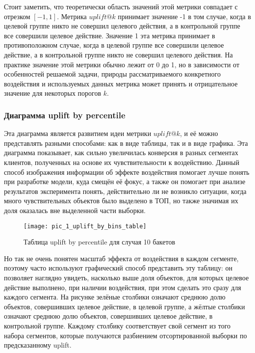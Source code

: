 Стоит заметить, что теоретически область значений этой метрики совпадает с отрезком $[-1, 1]$. Метрика $uplift@k$ принимает значение -1 в том случае, когда в целевой группе никто не совершил целевого действия, а в контрольной группе все совершили целевое действие. Значение 1 эта метрика принимает в противоположном случае, когда в целевой группе все совершили целевое действие, а в контрольной группе никто не совершил целевого действия. На практике значение этой метрики обычно лежит от 0 до 1, но в зависимости от особенностей решаемой задачи, природы рассматриваемого конкретного воздействия и используемых данных метрика может принять и отрицательное значение для некоторых порогов $k$.




\subsubsection*{Диаграмма uplift by percentile}

Эта диаграмма является развитием идеи метрики $uplift@k$, и её можно представлять разными способами: как в виде таблицы, так и в виде графика. Эта диаграмма показывает, как сильно увеличилась конверсия в разных сегментах клиентов, полученных на основе их чувствительности к воздействию. Данный способ изображения информации об эффекте воздействия помогает лучше понять при разработке модели, куда смещён её фокус, а также он помогает при анализе результатов эксперимента понять, действительно ли не возникло ситуации, когда много чувствительных объектов было выделено в ТОП, но также значимая их доля оказалась вне выделенной части выборки.

\begin{figure}[ht]
\centering
\texttt{[image: pic\_1\_uplift\_by\_bins\_table]}
\centering
\caption{Таблица uplift by percentile для случая 10 бакетов}
\label{fig:pic_1_uplift_by_bins_table}
\end{figure}

Но так не очень понятен масштаб эффекта от воздействия в каждом сегменте, поэтому часто используют графический способ представить эту таблицу: он позволяет наглядно увидеть, насколько выше доля объектов, для которых целевое действие выполнено, при наличии воздействия, при этом сделать это сразу для каждого сегмента. На рисунке зелёные столбики означают среднюю долю объектов, совершивших целевое действие, в целевой группе, а жёлтые столбики означают среднюю долю объектов, совершивших целевое действие, в контрольной группе. Каждому столбику соответствует свой сегмент из того набора сегментов, которые получаются разбиением отсортированной выборки по предсказанному uplift.

